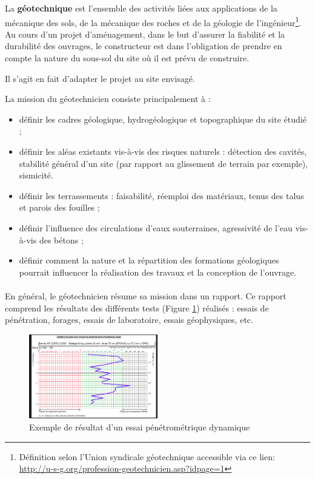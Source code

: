 \par 
La \textbf{géotechnique} est l’ensemble des 
activités liées aux applications de la mécanique des sols, de la mécanique 
des roches et de la géologie de l’ingénieur\footnote{
    Définition selon l’Union syndicale géotechnique accessible via ce lien: 
    \url{http://u-s-g.org/profession-geotechnicien.asp?idpage=1}}.
Au cours d'un projet d'aménagement, dans le but d'assurer  la fiabilité et la durabilité
des ouvrages, le constructeur est dans l'obligation de prendre en compte
la nature du sous-sol du site où il est prévu de construire.

Il s'agit en fait d'adapter le projet au site envisagé.
\par
La mission du géotechnicien consiste principalement à \cite{Chamel}\cite{benachenhou2019approche}:
\begin{itemize}
    \item définir les cadres géologique, hydrogéologique et topographique 
    du site étudié ;
    \item définir les aléas existants vis-à-vis des risques naturels : 
    détection des cavités, stabilité général d’un site (par rapport au 
    glissement de terrain par exemple), sismicité.
    \item définir les terrassements : faisabilité, réemploi des matériaux, 
    tenus des talus et parois des fouilles ;
    \item définir l’influence des circulations d’eaux souterraines, 
    agressivité de l’eau vis-à-vis des bétons ;
    \item définir comment la nature et la répartition des 
    formations géologiques pourrait influencer la réalisation des travaux et la conception 
    de l’ouvrage.
\end{itemize}
\paragraph{}
En général, le géotechnicien résume sa mission dans un rapport.
Ce rapport comprend les résultats des différents tests (Figure \ref{fig:test_penetrometrique}) 
réalisés : essais de pénétration, forages, essais de laboratoire,
essais géophysiques, etc.
\begin{figure}
    \centering
    \includegraphics[width=0.5\textwidth]{images/Contexte/penetrographe.png}
    \caption{Exemple de résultat d'un essai pénétrométrique dynamique \cite{penetrometrie}}
    \label{fig:test_penetrometrique}
\end{figure} 

